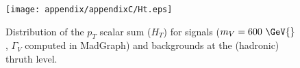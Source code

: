% 


\begin{figure}[!h!tpd]
  \centering
  \texttt{[image: appendix/appendixC/Ht.eps]}
  \caption{
      Distribution of the $p_T$ scalar sum ($H_T$) for signals ($m_V=600~\GeV{}$, $\Gamma_V$ computed in MadGraph) and backgrounds at the (hadronic) thruth level.
  }   
  \label{fig:appB:HT}
\end{figure}

